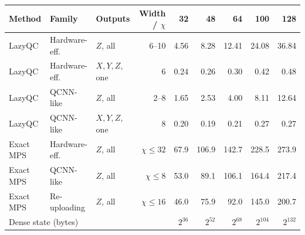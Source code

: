 \begin{tabular}{lllrrrrrr}
\toprule
Method & Family & Outputs & Width / $\chi$ & 32 & 48 & 64 & 100 & 128\\
\midrule
LazyQC & Hardware-eff. & $Z$, all & 6--10 & 4.56 & 8.28 & 12.41 & 24.08 & 36.84\\
LazyQC & Hardware-eff. & $X,Y,Z$, one & 6 & 0.24 & 0.26 & 0.30 & 0.42 & 0.48\\
LazyQC & QCNN-like & $Z$, all & 2--8 & 1.65 & 2.53 & 4.00 & 8.11 & 12.64\\
LazyQC & QCNN-like & $X,Y,Z$, one & 8 & 0.20 & 0.19 & 0.21 & 0.27 & 0.27\\
\midrule
Exact MPS & Hardware-eff. & $Z$, all & $\chi{\le}32$ & 67.9 & 106.9 & 142.7 & 228.5 & 273.9\\
Exact MPS & QCNN-like & $Z$, all & $\chi{\le}8$ & 53.0 & 89.1 & 106.1 & 164.4 & 217.4\\
Exact MPS & Re-uploading & $Z$, all & $\chi{\le}16$ & 46.0 & 75.9 & 92.0 & 145.0 & 200.7\\
\midrule
\multicolumn{4}{l}{Dense state (bytes)} & $2^{36}$ & $2^{52}$ & $2^{68}$ & $2^{104}$ & $2^{132}$\\
\bottomrule
\end{tabular}
